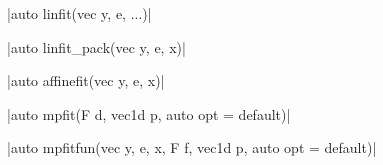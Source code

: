 \funcitem \cppinline|auto linfit(vec y, e, ...)| 

\cppinline|auto linfit_pack(vec y, e, x)| 

\funcitem \cppinline|auto affinefit(vec y, e, x)| 

\funcitem \cppinline|auto mpfit(F d, vec1d p, auto opt = default)| 

\funcitem \cppinline|auto mpfitfun(vec y, e, x, F f, vec1d p, auto opt = default)| 
